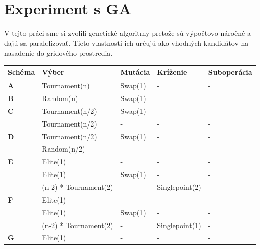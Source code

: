 \section{Experiment s GA}
V tejto práci sme si zvolili genetické algoritmy pretože sú výpočtovo náročné a dajú sa paralelizovať.
Tieto vlastnosti ich určujú ako vhodných kandidátov na nasadenie do gridového prostredia.
\begin{table}[!h]
\centering
\begin{tabular}{@{}lllll@{}}
\toprule
\textbf{Schéma} & \textbf{Výber}            & \textbf{Mutácia} & \textbf{Kríženie} & \textbf{Suboperácia} \\ \midrule
\textbf{A}      & Tournament(n)             & Swap(1)          & -                 & -                    \\ \midrule
\textbf{B}      & Random(n)                 & Swap(1)          & -                 & -                    \\ \midrule
\textbf{C}      & Tournament(n/2)           & Swap(1)          & -                 & -                    \\
                & Tournament(n/2)           & -                & -                 & -                    \\ \midrule
\textbf{D}      & Tournament(n/2)           & Swap(1)          & -                 & -                    \\
                & Random(n/2)               & -                & -                 & -                    \\ \midrule
\textbf{E}      & Elite(1)                  & -                & -                 & -                    \\
                & Elite(1)                  & Swap(1)          & -                 & -                    \\
                & (n-2) * Tournament(2)     & -                & Singlepoint(2)    &                      \\ \midrule
\textbf{F}      & Elite(1)                  & -                & -                 & -                    \\
                & Elite(1)                  & Swap(1)          & -                 & -                    \\
                & (n-2) * Tournament(2)     & -                & Singlepoint(1)    & -                    \\ \midrule
\textbf{G}      & Elite(1)                  & -                & -                 & -                    \\

\end{tabular}
\end{table}
